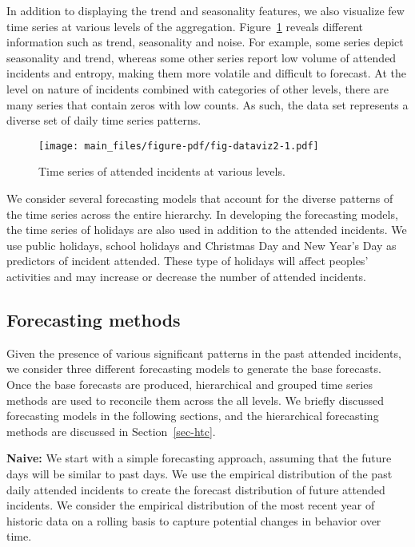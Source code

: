 \documentclass[
  authoryear,
  preprint,
  3p]{elsarticle}
\begin{document}
In addition to displaying the trend and seasonality features, we also
visualize few time series at various levels of the aggregation.
Figure~\ref{fig-dataviz2} reveals different information such as trend,
seasonality and noise. For example, some series depict seasonality and
trend, whereas some other series report low volume of attended incidents
and entropy, making them more volatile and difficult to forecast. At the
level on nature of incidents combined with categories of other levels,
there are many series that contain zeros with low counts. As such, the
data set represents a diverse set of daily time series patterns.

\begin{figure}

{\centering \texttt{[image: main\_files/figure-pdf/fig-dataviz2-1.pdf]}

}

\caption{\label{fig-dataviz2}Time series of attended incidents at
various levels.}

\end{figure}

We consider several forecasting models that account for the diverse
patterns of the time series across the entire hierarchy. In developing
the forecasting models, the time series of holidays are also used in
addition to the attended incidents. We use public holidays, school
holidays and Christmas Day and New Year's Day as predictors of incident
attended. These type of holidays will affect peoples' activities and may
increase or decrease the number of attended incidents.

\hypertarget{forecasting-methods}{%
\subsection{Forecasting methods}\label{forecasting-methods}}

Given the presence of various significant patterns in the past attended
incidents, we consider three different forecasting models to generate
the base forecasts. Once the base forecasts are produced, hierarchical
and grouped time series methods are used to reconcile them across the
all levels. We briefly discussed forecasting models in the following
sections, and the hierarchical forecasting methods are discussed in
Section~\ref{sec-htc}.

\textbf{Naive:} We start with a simple forecasting approach, assuming
that the future days will be similar to past days. We use the empirical
distribution of the past daily attended incidents to create the forecast
distribution of future attended incidents. We consider the empirical
distribution of the most recent year of historic data on a rolling basis
to capture potential changes in behavior over
time.
\end{document}
